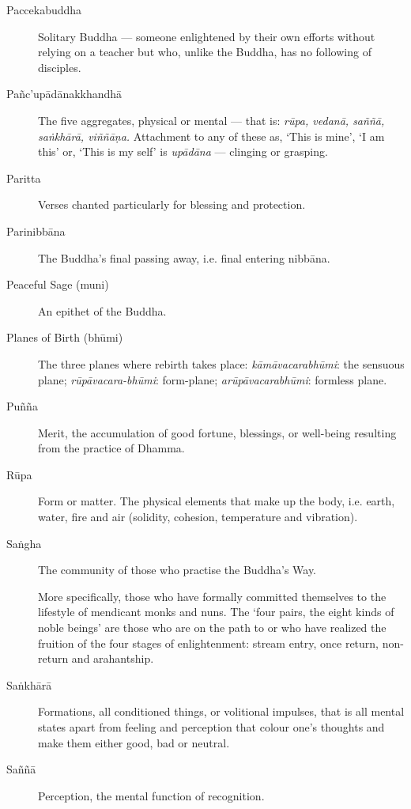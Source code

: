 \begin{description}
\item[Paccekabuddha] Solitary Buddha --- someone enlightened by their own
  efforts without relying on a teacher but who, unlike the Buddha, has
  no following of disciples.

\item[Pañc’upādānakkhandhā] The five aggregates, physical or mental ---
  that is: \emph{rūpa, vedanā, saññā, saṅkhārā, viññāṇa.} Attachment to
  any of these as, ‘This is mine’, ‘I am this’ or, ‘This is my self’ is
  \emph{upādāna} --- clinging or grasping.

\item[Paritta] Verses chanted particularly for blessing and protection.

\item[Parinibbāna] The Buddha’s final passing away, i.e. final entering
  nibbāna.

\item[Peaceful Sage (muni)] An epithet of the Buddha.

\item[Planes of Birth (bhūmi)] The three planes where rebirth takes
  place: \emph{kāmāvacarabhūmi}: the sensuous plane;
  \emph{rūpāvacara-bhūmi}: form-plane; \emph{arūpāvacarabhūmi}: formless
  plane.

\item[Puñña] Merit, the accumulation of good fortune, blessings, or
  well-being resulting from the practice of Dhamma.

\item[Rūpa] Form or matter. The physical elements that make up the body,
  i.e. earth, water, fire and air (solidity, cohesion, temperature and
  vibration).

\item[Saṅgha] The community of those who practise the Buddha’s Way.

  More specifically, those who have formally committed themselves to the
lifestyle of mendicant monks and nuns. The `four pairs, the eight kinds of
noble beings' are those who are on the path to or who have realized the
fruition of the four stages of enlightenment: stream entry, once return,
non-return and arahantship.

\item[Saṅkhārā] Formations, all conditioned things, or volitional
  impulses, that is all mental states apart from feeling and perception
  that colour one’s thoughts and make them either good, bad or neutral.

\item[Saññā] Perception, the mental function of recognition.


\end{description}
